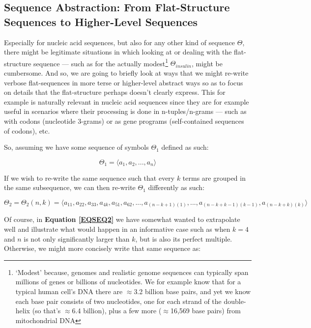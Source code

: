 \documentclass[a4paper, 18pt]{article} %
\begin{document}
\subsection{Sequence Abstraction: From Flat-Structure Sequences to Higher-Level Sequences}

Especially for nucleic acid sequences, but also for any other kind of sequence $\Theta$, there might be legitimate situations in which looking at or dealing with the flat-structure sequence --- such as for the actually modest\footnote{`Modest' because, genomes and realistic genome sequences can typically span millions of genes or billions of nucleotides. We for example know that for a typical human cell's DNA there are $\approx$3.2 billion base pairs\cite{Venter2001}, and yet we know each base pair consists of two nucleotides, one for each strand of the double-helix (so that's $\approx$6.4 billion), plus a few more ($\approx$16,569 base pairs) from mitochondrial DNA\cite{Anderson1981}} $\Theta_{insulin}$, might be cumbersome. And so, we are going to briefly look at ways that we might re-write verbose flat-sequences in more terse or higher-level abstract ways so as to focus on details that the flat-structure perhaps doesn't clearly express. This for example is naturally relevant in nucleic acid sequences since they are for example useful in scenarios where their processing is done in n-tuples/n-grams --- such as with codons (nucleotide 3-grams) or as gene programs (self-contained sequences of codons), etc.

So, assuming we have some sequence of symbols $\Theta_1$ defined as such:

\begin{equation}
\label{EQSEQ1}
\Theta_1 = \langle a_1, a_2,...,a_n\rangle
\end{equation}

If we wish to re-write the same sequence such that every $k$ terms are grouped in the same subsequence, we can then re-write $\Theta_1$ differently as such:


\begin{equation}
\label{EQSEQ2}
\Theta_2 = \Theta_2(n,k) = \langle a_{11}, a_{22}, a_{33}, a_{4k}, a_{51}, a_{62},...,a_{(n-k+1)(1)},...,a_{(n-k+k-1)(k-1)},a_{(n-k+k)(k)}\rangle
\end{equation}

Of course, in \textbf{Equation \ref{EQSEQ2}} we have somewhat wanted to extrapolate well and illustrate what would happen in an informative case such as when $k = 4$ and $n$ is not only significantly larger than $k$, but is also its perfect multiple. Otherwise, we might more concisely write that same sequence as:
\end{document}
